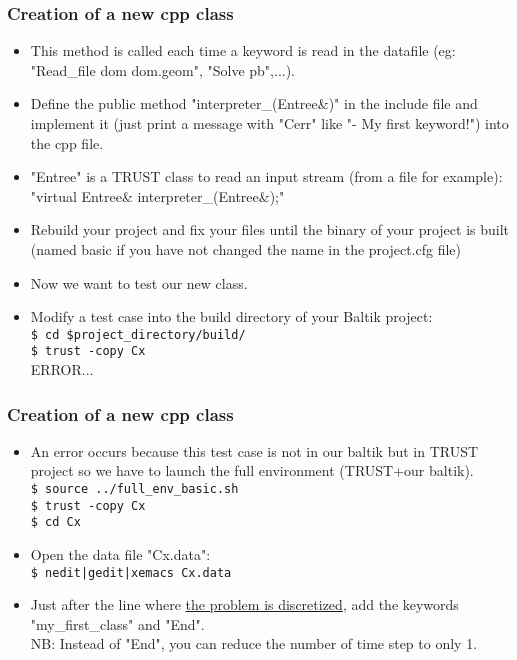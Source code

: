 \documentclass[10pt, hyperref={unicode=true,pdfusetitle, bookmarks=true,bookmarksnumbered=false,bookmarksopen=false, breaklinks=false,pdfborder={0 0 1},backref=true,colorlinks=true,linkcolor=darkblue,pageanchor, urlcolor=darkblue}]{beamer}
\begin{document}
\begin{frame}
\frametitle{Creation of a new cpp class}
\begin{block}{}

\begin{itemize}
\item This method is called each time a keyword is read in the datafile (eg: "Read\_file dom dom.geom", "Solve pb",...).
\item Define the public method "interpreter\_(Entree\&)" in the include file and implement it
(just print a message with "Cerr" like "- My first keyword!") into the cpp file. 
\item "Entree" is a TRUST class to read an input stream (from a file for example):\\
"virtual Entree\& interpreter\_(Entree\&);"
\item Rebuild your project and fix your files until the binary of your project is built (named
basic if you have not changed the name in the project.cfg file)\\
\item Now we want to test our new class.
\item Modify a test case into the build directory of your Baltik project:\\
\texttt{\$ cd \$project\_directory/build/}\\
\texttt{\$ trust -copy Cx}\\
ERROR...
\end{itemize}

\end{block}
\end{frame}
\begin{frame}
\frametitle{Creation of a new cpp class}
\begin{block}{}

\begin{itemize}
\item An error occurs because this test case is not in our baltik but in TRUST project so we have to launch the full environment (TRUST+our baltik).\\
\texttt{\$ source ../full\_env\_basic.sh}\\
\texttt{\$ trust -copy Cx}\\
\texttt{\$ cd Cx}\\

\item Open the data file "Cx.data":\\
\texttt{\$ nedit|gedit|xemacs Cx.data}

\item Just after the line where \underline{the problem is discretized}, add the keywords "my\_first\_class" and "End".\\
NB: Instead of "End", you can reduce the number of time step to only 1.\\
\end{itemize}

\end{block}
\end{frame}
\end{document}
